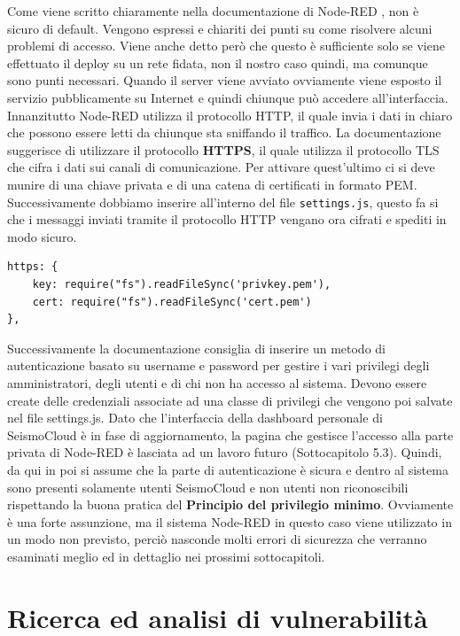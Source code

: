 \documentclass[a4paper,10pt]{memoir}
\begin{document}
Come viene scritto chiaramente nella documentazione di Node-RED \cite{securing}, non è sicuro di default.
Vengono espressi e chiariti dei punti su come risolvere alcuni problemi di accesso.
Viene anche detto però che questo è sufficiente solo se viene effettuato il deploy su un rete fidata, non il nostro caso quindi, ma comunque sono punti necessari.
Quando il server viene avviato ovviamente viene esposto il servizio pubblicamente su Internet e quindi chiunque può accedere all'interfaccia.
Innanzitutto Node-RED utilizza il protocollo HTTP, il quale invia i dati in chiaro che possono essere letti da chiunque sta sniffando il traffico.
La documentazione suggerisce di utilizzare il protocollo \textbf{HTTPS}, il quale utilizza il protocollo TLS che cifra i dati sui canali di comunicazione.
Per attivare quest'ultimo ci si deve munire di una chiave privata e di una catena di certificati in formato PEM.
Successivamente dobbiamo inserire all'interno del file \texttt{settings.js}, questo fa si che i messaggi inviati tramite il protocollo HTTP vengano ora cifrati e spediti in modo sicuro.
\begin{lstlisting}
https: {
    key: require("fs").readFileSync('privkey.pem'),
    cert: require("fs").readFileSync('cert.pem')
},
\end{lstlisting}

Successivamente la documentazione consiglia di inserire un metodo di autenticazione basato su username e password per gestire i vari privilegi degli amministratori, degli utenti e di chi non ha accesso al sistema.
Devono essere create delle credenziali associate ad una classe di privilegi che vengono poi salvate nel file settings.js.
Dato che l'interfaccia della dashboard personale di SeismoCloud è in fase di aggiornamento, la pagina che gestisce l'accesso alla parte privata di Node-RED è lasciata ad un lavoro futuro (Sottocapitolo 5.3).
Quindi, da qui in poi si assume che la parte di autenticazione è sicura e dentro al sistema sono presenti solamente utenti SeismoCloud e non utenti non riconoscibili rispettando la buona pratica del \textbf{Principio del privilegio minimo}. Ovviamente è una forte assunzione, ma il sistema Node-RED in questo caso viene utilizzato in un modo non previsto, perciò nasconde molti errori di sicurezza che verranno esaminati meglio ed in dettaglio nei prossimi sottocapitoli.

\section{Ricerca ed analisi di vulnerabilità}
\end{document}
